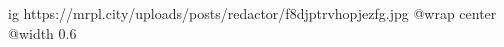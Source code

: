  
 
 
 
 

\ifcmt
  ig https://mrpl.city/uploads/posts/redactor/f8djptrvhopjezfg.jpg
  @wrap center
  @width 0.6
\fi
